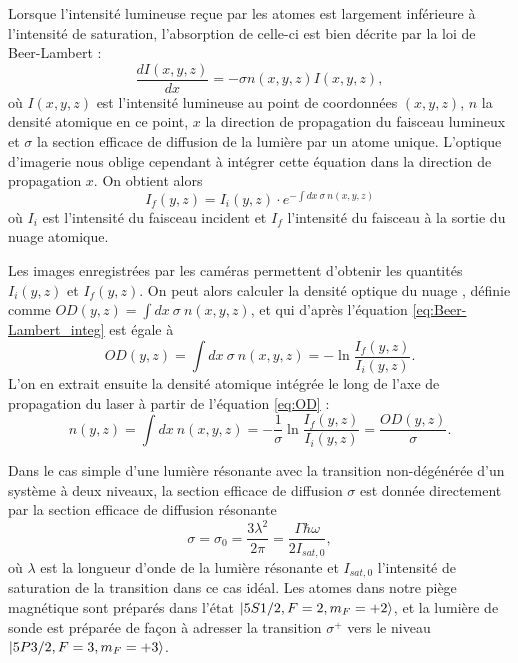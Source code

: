 Lorsque l'intensité lumineuse reçue par les atomes est largement inférieure à l'intensité de saturation, l'absorption de celle-ci est bien décrite par la loi de Beer-Lambert :
\begin{equation}
\label{eq:Beer-Lambert}
\frac{dI(x,y,z)}{dx} = -\sigma n(x,y,z) I(x,y,z),
\end{equation}
où $I(x,y,z)$ est l'intensité lumineuse au point de coordonnées $(x,y,z)$, $n$ la densité atomique en ce point, $x$ la direction de propagation du faisceau lumineux et $\sigma$ la section efficace de diffusion de la lumière par un atome unique.
L'optique d'imagerie nous oblige cependant à intégrer cette équation dans la direction de propagation $x$.
On obtient alors 
\begin{equation}
\label{eq:Beer-Lambert_integ}
I_f(y,z) = I_i (y,z)\cdot e^{-\int dx~\sigma~n(x,y,z)}
\end{equation}
où $I_i$ est l'intensité du faisceau incident et $I_f$ l'intensité du faisceau à la sortie du nuage atomique.

Les images enregistrées par les caméras permettent d'obtenir les quantités $I_i(y,z)$ et $I_f(y,z)$.
On peut alors calculer la densité optique du nuage , définie comme $OD(y,z) = \int dx~\sigma~n(x,y,z)$, et qui d'après l'équation \eqref{eq:Beer-Lambert_integ} est égale à
\begin{equation}
\label{eq:OD}
OD(y,z) = \int dx~\sigma~n(x,y,z) = -\ln \frac{I_f(y,z)}{I_i(y,z)}.
\end{equation}
L'on en extrait ensuite la densité atomique intégrée le long de l'axe de propagation du laser à partir de l'équation \eqref{eq:OD} :
\begin{equation}
\label{eq:atomic_density}
n(y,z) = \int{dx~n(x,y,z)} = -\frac{1}{\sigma} \ln \frac{I_f(y,z)}{I_i(y,z)} = \frac{OD(y,z)}{\sigma}.
\end{equation}
		
Dans le cas simple d'une lumière résonante avec la transition non-dégénérée d'un système à deux niveaux, la section efficace de diffusion $\sigma$ est donnée directement par la section efficace de diffusion résonante 
\begin{equation}
\sigma = \sigma_0 = \frac{3\lambda^2}{2\pi} = \frac{\Gamma \hbar\omega}{2I_{sat,0}},
\end{equation}
où $\lambda$ est la longueur d'onde de la lumière résonante et $I_{sat,0}$ l'intensité de saturation de la transition dans ce cas idéal.
Les atomes dans notre piège magnétique sont préparés dans l'état $\ket{5S1/2,F=2,m_F=+2}$, et la lumière de sonde est préparée de façon à adresser la transition $\sigma^+$ vers le niveau $\ket{5P3/2,F=3,m_F=+3}$.

